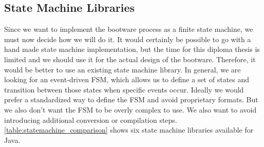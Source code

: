 \subsection{State Machine Libraries}
\label{implementation:selecting:statemachine}

Since we want to implement the bootware process as a finite state machine, we must now decide how we will do it.
It would certainly be possible to go with a hand made state machine implementation, but the time for this diploma thesis is limited and we should use it for the actual design of the bootware.
Therefore, it would be better to use an existing state machine library.
In general, we are looking for an event-driven FSM, which allows us to define a set of states and transition between those states when specific events occur.
Ideally we would prefer a standardized way to define the FSM and avoid proprietary formats.
But we also don't want the FSM to be overly complex to use.
We also want to avoid introducing additional conversion or compilation steps.
\autoref{table:statemachine_comparison} shows six state machine libraries available for Java.

